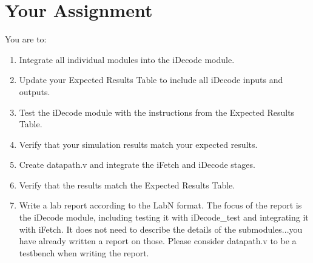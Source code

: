 \section{Your Assignment}

You are to:
\begin{enumerate}
\item Integrate all individual modules into the iDecode module.
\item Update your Expected Results Table to include all iDecode inputs and outputs.
\item Test the iDecode module with the instructions from the Expected Results Table.
\item Verify that your simulation results match your expected results.
\item Create datapath.v and integrate the iFetch and iDecode stages.
\item Verify that the results match the Expected Results Table.
\item Write a lab report according to the LabN format.  The focus of the report is the iDecode module, including testing it with iDecode\_test and integrating it with iFetch.  It does not need to describe the details of the submodules...you have already written a report on those.  Please consider datapath.v to be a testbench when writing the report.
\end{enumerate} 